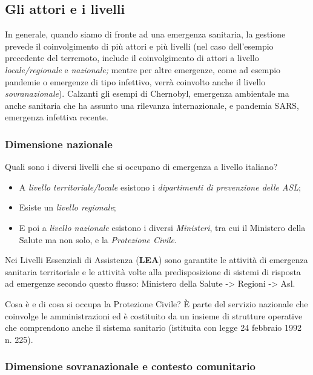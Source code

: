 \subsection{Gli attori e i livelli}

In generale, quando siamo di fronte ad una emergenza sanitaria, la
gestione prevede il coinvolgimento di più attori e più livelli (nel caso
dell'esempio precedente del terremoto, include il coinvolgimento di
attori a livello \emph{locale/regionale} e \emph{nazionale;} mentre per
altre emergenze, come ad esempio pandemie o emergenze di tipo infettivo,
verrà coinvolto anche il livello \emph{sovranazionale}). Calzanti gli
esempi di Chernobyl, emergenza ambientale ma anche sanitaria che ha
assunto una rilevanza internazionale, e pandemia SARS, emergenza
infettiva recente.

\subsubsection{Dimensione nazionale}

Quali sono i diversi livelli che si occupano di emergenza a livello
italiano?

\begin{itemize}
\item
  A \emph{livello} \emph{territoriale/locale} esistono i
  \emph{dipartimenti di prevenzione delle ASL};
\item
  Esiste un \emph{livello regionale};
\item
  E poi a \emph{livello nazionale} esistono i diversi \emph{Ministeri},
  tra cui il Ministero della Salute ma non solo, e la \emph{Protezione
  Civile}.
\end{itemize}

Nei Livelli Essenziali di Assistenza (\textbf{LEA}) sono garantite le
attività di emergenza sanitaria territoriale e le attività volte alla
predisposizione di sistemi di risposta ad emergenze secondo questo
flusso: Ministero della Salute -> Regioni -> Asl.

Cosa è e di cosa si occupa la Protezione Civile? È parte del servizio
nazionale che coinvolge le amministrazioni ed è costituito da un insieme
di strutture operative che comprendono anche il sistema sanitario
(istituita con legge 24 febbraio 1992 n. 225).

\subsubsection{Dimensione sovranazionale e contesto comunitario}

